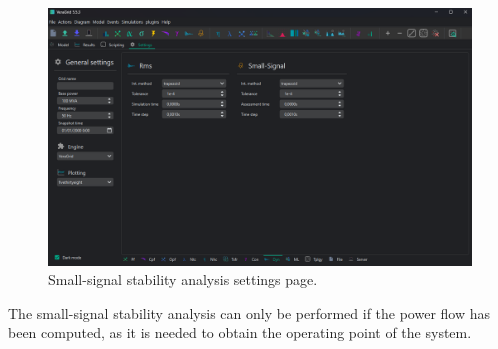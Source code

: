 \begin{figure}[H]
  \centering
  \includegraphics[width=0.8\linewidth]{figures/settings_GUI.png}
  \caption{Small-signal stability analysis settings page.}
  \label{fig:smallsignal_settings_GUI}
\end{figure}

The small-signal stability analysis can only be performed if the power flow has been computed,
 as it is needed to obtain the operating point of the system.


